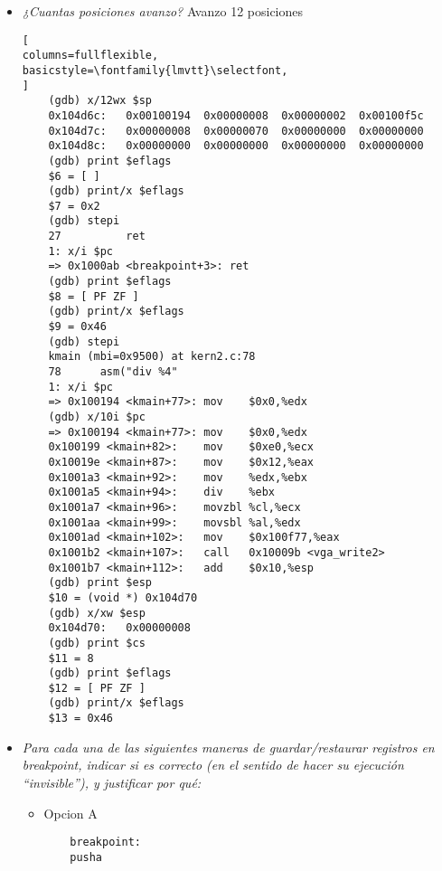 \documentclass[a4paper, 12pt]{article}
\begin{document}
\begin{itemize}
\begin{lstlisting}[
columns=fullflexible,
basicstyle=\fontfamily{lmvtt}\selectfont,
]
	Breakpoint 1, idt_init () at interrupts.c:27
	27	    idt_install(T_BRKPT, breakpoint);
	1: x/i $pc
	=> 0x100586 <idt_init+3>:	push   $0x1000a8
	(gdb) finish
	Correr hasta la salida desde #0  idt_init () at interrupts.c:27
	kmain (mbi=0x9500) at kern2.c:73
	73	    asm("int3");  // (b)
	1: x/i $pc
	=> 0x100193 <kmain+76>:	int3
	(gdb) x/10i $pc
	=> 0x100193 <kmain+76>:	int3
	0x100194 <kmain+77>:	mov    $0x0,%edx
	0x100199 <kmain+82>:	mov    $0xe0,%ecx
	0x10019e <kmain+87>:	mov    $0x12,%eax
	0x1001a3 <kmain+92>:	mov    %edx,%ebx
	0x1001a5 <kmain+94>:	div    %ebx
	0x1001a7 <kmain+96>:	movzbl %cl,%ecx
	0x1001aa <kmain+99>:	movsbl %al,%edx
	0x1001ad <kmain+102>:	mov    $0x100f77,%eax
	0x1001b2 <kmain+107>:	call   0x10009b <vga_write2>
	(gdb) print $esp
	$1 = (void *) 0x104d78
	(gdb) x/xw $esp
	0x104d78:	0x00100f5c
	(gdb) print $cs
	$2 = 8
	(gdb) print $eflags
	$3 = [ ]
	(gdb) print/x $eflags
	$4 = 0x2
	(gdb) stepi
	breakpoint () at idt_entry.S:26
	26	        test %eax, %eax
	1: x/i $pc
	=> 0x1000a9 <breakpoint+1>:	test   %eax,%eax
	(gdb) print $esp
	$5 = (void *) 0x104d6c
\end{lstlisting}
				\item \textit{¿Cuantas posiciones avanzo?}
				Avanzo 12 posiciones
\begin{lstlisting}[
columns=fullflexible,
basicstyle=\fontfamily{lmvtt}\selectfont,
]
	(gdb) x/12wx $sp
	0x104d6c:	0x00100194	0x00000008	0x00000002	0x00100f5c
	0x104d7c:	0x00000008	0x00000070	0x00000000	0x00000000
	0x104d8c:	0x00000000	0x00000000	0x00000000	0x00000000
	(gdb) print $eflags
	$6 = [ ]
	(gdb) print/x $eflags
	$7 = 0x2
	(gdb) stepi
	27	        ret
	1: x/i $pc
	=> 0x1000ab <breakpoint+3>:	ret
	(gdb) print $eflags
	$8 = [ PF ZF ]
	(gdb) print/x $eflags
	$9 = 0x46
	(gdb) stepi
	kmain (mbi=0x9500) at kern2.c:78
	78	    asm("div %4"
	1: x/i $pc
	=> 0x100194 <kmain+77>:	mov    $0x0,%edx
	(gdb) x/10i $pc
	=> 0x100194 <kmain+77>:	mov    $0x0,%edx
	0x100199 <kmain+82>:	mov    $0xe0,%ecx
	0x10019e <kmain+87>:	mov    $0x12,%eax
	0x1001a3 <kmain+92>:	mov    %edx,%ebx
	0x1001a5 <kmain+94>:	div    %ebx
	0x1001a7 <kmain+96>:	movzbl %cl,%ecx
	0x1001aa <kmain+99>:	movsbl %al,%edx
	0x1001ad <kmain+102>:	mov    $0x100f77,%eax
	0x1001b2 <kmain+107>:	call   0x10009b <vga_write2>
	0x1001b7 <kmain+112>:	add    $0x10,%esp
	(gdb) print $esp
	$10 = (void *) 0x104d70
	(gdb) x/xw $esp
	0x104d70:	0x00000008
	(gdb) print $cs
	$11 = 8
	(gdb) print $eflags
	$12 = [ PF ZF ]
	(gdb) print/x $eflags
	$13 = 0x46
\end{lstlisting}
\item \textit{Para cada una de las siguientes maneras de
				guardar/restaurar registros en breakpoint, indicar si es
				correcto (en el sentido de hacer su ejecución “invisible”), y
				justificar por qué:}
				\begin{itemize}
					\item Opcion A
\begin{lstlisting}
	breakpoint:
	pusha


\end{lstlisting}
\end{itemize}
\end{itemize}
\end{document}
